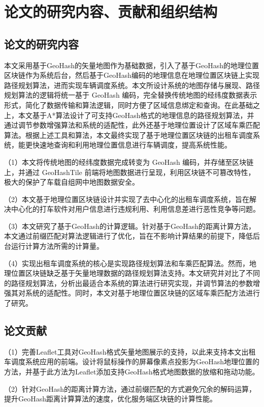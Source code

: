 \section{论文的研究内容、贡献和组织结构}
\subsection{论文的研究内容}

本文采用基于GeoHash的矢量地图作为基础数据，引入了基于GeoHash的地理位置区块链作为系统后台，然后基于GeoHash编码的地理信息在地理位置区块链上实现路径规划算法，进而实现车辆调度系统。本文所设计系统的地图存储与展现、路径规划算法的逻辑将统一基于 GeoHash 编码，完全替换传统地图的经纬度数据表示形式，简化了数据传输和算法逻辑，同时方便了区域信息绑定和查询。在此基础之上，本文基于A*算法设计了可支持GeoHash格式的地理信息的路径规划算法，并通过调节参数增强算法和系统的适配性，此外还基于地理位置设计了区域车乘匹配算法。根据上述工具和算法，本文最终实现了基于地理位置区块链的出租车调度系统，能更快速地查询和利用地理位置信息进行车辆调度，提高系统性能。

（1）本文将传统地图的经纬度数据完成转变为 GeoHash 编码，并存储至区块链上，并通过 GeoHashTile 前端将地图数据进行呈现，利用区块链不可篡改特性，极大的保护了车载自组网中地图数据安全。

（2）本文基于地理位置区块链设计并实现了去中心化的出租车调度系统，旨在解决中心化的打车软件对用户信息进行违规利用、利用信息差进行恶性竞争等问题。

（3）本文研究了基于GeoHash的计算逻辑。针对基于GeoHash的距离计算方法，本文通过前缀匹配对算法逻辑进行了优化，旨在不影响计算结果的前提下，降低后台运行计算方法所需的计算量。

（4）实现出租车调度系统的核心是实现路径规划算法和车乘匹配算法。然而，地理位置区块链缺乏基于矢量地理数据的路径规划算法支持。本文研究并对比了不同的路径规划算法，分析出最适合本系统的算法进行研究实现，并调节算法的参数增强其对系统的适配性。同时，本文对基于地理位置区块链的区域车乘匹配方法进行了研究。

\subsection{论文贡献}
（1）完善Leaflet工具对GeoHash格式矢量地图展示的支持，以此来支持本文出租车调度系统应用的前端。设计将鼠标操作的屏幕像素点投影为GeoHash地理位置的方法，并基于此方法为Leaflet添加支持GeoHash格式地图数据的放缩和拖动功能。

（2）针对GeoHash的距离计算方法，通过前缀匹配的方式避免冗余的解码运算，提升GeoHash距离计算算法的速度，优化服务端区块链的计算性能。

